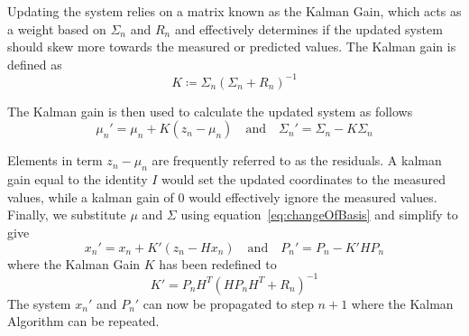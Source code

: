 Updating the system relies on a matrix known as the Kalman Gain, which acts as a weight based on $\Sigma_n$ and $R_n$ and effectively determines if the updated system should skew more towards the measured or predicted values. The Kalman gain is defined as
\begin{equation}
	\label{eq:gain}
	K\coloneqq \Sigma_n\left(\Sigma_n+R_n\right)^{-1}
\end{equation}

The Kalman gain is then used to calculate the updated system as follows
\begin{equation}
	\label{eq:update1}
	\mu_n'=\mu_n+K\left(z_n-\mu_n\right) \quad \textrm{and} \quad \Sigma_n'=\Sigma_n-K\Sigma_n
\end{equation}

Elements in term $z_n-\mu_n$ are frequently referred to as the residuals. A kalman gain equal to the identity $I$ would set the updated coordinates to the measured values, while a kalman gain of $0$ would effectively ignore the measured values. Finally, we substitute $\mu$ and $\Sigma$ using equation~\ref{eq:changeOfBasis} and simplify to give
\begin{equation}
	x_n'=x_n+K'(z_n-Hx_n) \quad \mathrm{and} \quad P_n'= P_n-K'HP_n
\end{equation}
where the Kalman Gain $K$ has been redefined to
\begin{equation} \label{eq:gain2}
	K'=P_nH^T(HP_nH^T+R_n)^{-1}
\end{equation}
The system $x_n'$ and $P_n'$ can now be propagated to step $n+1$ where the Kalman Algorithm can be repeated.

